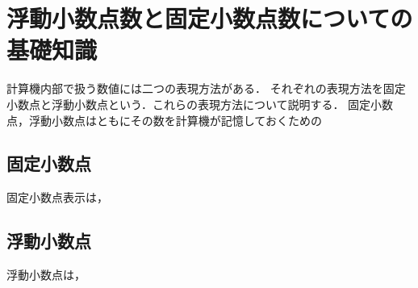 \chapter{浮動小数点数と固定小数点数についての基礎知識}
計算機内部で扱う数値には二つの表現方法がある．
それぞれの表現方法を固定小数点と浮動小数点という．これらの表現方法について説明する．
固定小数点，浮動小数点はともにその数を計算機が記憶しておくための

\section{固定小数点}
固定小数点表示は，

\section{浮動小数点}
浮動小数点は，
